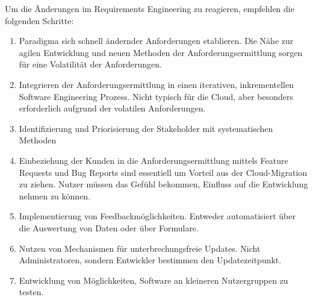 Um die Änderungen im Requirements Engineering zu reagieren, empfehlen 
 die folgenden Schritte:
\begin{enumerate}
	\item Paradigma sich schnell ändernder Anforderungen etablieren. Die 
Nähe zur agilen Entwicklung und neuen Methoden der Anforderungsermittlung 
sorgen für eine Volatilität der Anforderungen.
	\item Integrieren der Anforderungsermittlung in einen iterativen, 
inkrementellen Software Engineering Prozess. Nicht typisch für die Cloud, aber 
besonders erforderlich aufgrund der volatilen Anforderungen.
	\item Identifizierung und Priorisierung der Stakeholder mit 
systematischen Methoden
	\item Einbeziehung der Kunden in die Anforderungsermittlung mittels 
Feature Requests und Bug Reports sind essentiell um Vorteil aus der 
Cloud-Migration zu ziehen. Nutzer müssen das Gefühl bekommen, Einfluss auf die 
Entwicklung nehmen zu können.
	\item Implementierung von Feedbackmöglichkeiten. Entweder automatisiert 
über die Auswertung von Daten oder über Formulare. 
	\item Nutzen von Mechanismen für unterbrechungsfreie Updates. Nicht 
Administratoren, sondern Entwickler bestimmen den Updatezeitpunkt.
	\item Entwicklung von Möglichkeiten, Software an kleineren 
Nutzergruppen zu testen.
\end{enumerate}


